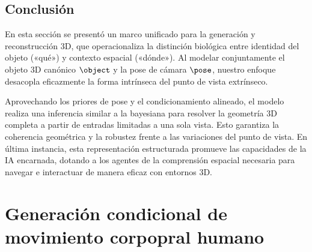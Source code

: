 \documentclass[../../book-main_es.tex]{subfiles}
\begin{document}
\subsection{Conclusión}
En esta sección se presentó un marco unificado para la generación y reconstrucción 3D, 
que operacionaliza la distinción biológica entre identidad del objeto («qué») y 
contexto espacial («dónde»). Al modelar conjuntamente el objeto 3D canónico $\object$ y la 
pose de cámara $\pose$, nuestro enfoque desacopla eficazmente la forma 
intrínseca del punto de vista extrínseco.

Aprovechando los priores de pose y el condicionamiento alineado, el modelo realiza una 
inferencia similar a la bayesiana para resolver la geometría 3D completa a partir 
de entradas limitadas a una sola vista. Esto garantiza la coherencia geométrica y la robustez frente a 
las variaciones del punto de vista. En última instancia, esta representación estructurada 
promueve las capacidades de la IA encarnada, dotando a los agentes de la comprensión espacial 
necesaria para navegar e interactuar de manera eficaz con entornos 3D.

\section{Generación condicional de movimiento corpopral humano}
\label{sec:egoallo}

%
\end{document}
